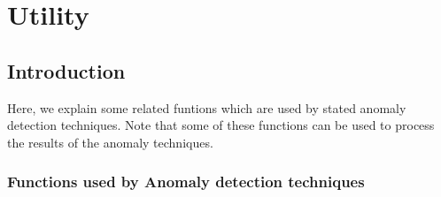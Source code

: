 \chapter{Utility}

\section{Introduction}
         
Here, we explain some related funtions which are used by stated anomaly 
detection techniques. Note that some of these functions can be used to process 
the results of the anomaly techniques.

\subsection{Functions used by Anomaly detection techniques}

